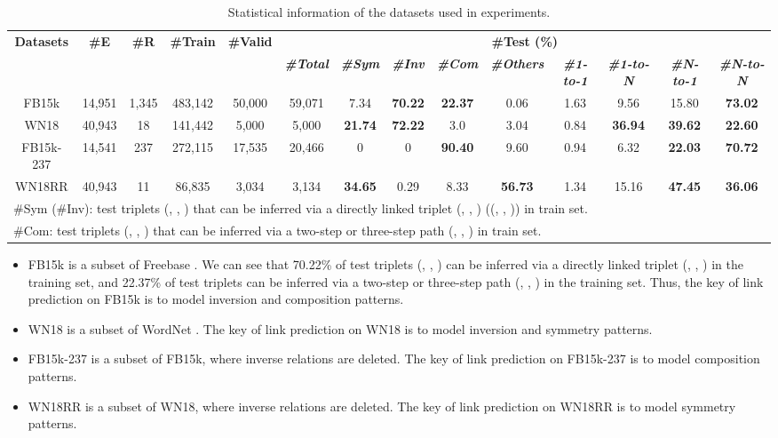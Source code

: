 \documentclass[conference]{IEEEtran}
\begin{document}
\begin{table*}[t]
	\caption{
		Statistical information of the datasets used in experiments.
	}
	\label{Datasets}
	\begin{center}
	\begin{tabular}{|c|c|c|c|c|c||c|c|c|c||c|c|c|c|}
		\hline
		\multirow{2}{*}{\textbf{Datasets}}
		& \multirow{2}{*}{\textbf{\#E}}
		& \multirow{2}{*}{\textbf{\#R}}
		& \multirow{2}{*}{\textbf{\#Train}}
		& \multirow{2}{*}{\textbf{\#Valid}}
		& \multicolumn{9}{c|}{\textbf{\#Test (\%)}}  \\
		\cline{6-14}
		&&&&
		& \textbf{\textit{\#Total}}
		& \textbf{\textit{\#Sym}}	& \textbf{\textit{\#Inv}}	& \textbf{\textit{\#Com}}
		& \textbf{\textit{\#Others}}
		& \textbf{\textit{\#1-to-1}}  & \textbf{\textit{\#1-to-N}}  & \textbf{\textit{\#N-to-1}}
		& \textbf{\textit{\#N-to-N}} \\
		\hline
		FB15k
		& 14,951 & 1,345 & 483,142 & 50,000 & 59,071
		& 7.34	& \textbf{70.22}	& \textbf{22.37}	& 0.06
		& 1.63	& 9.56				& 15.80				& \textbf{73.02} \\
		\hline
		WN18
		& 40,943 & 18	 & 141,442 & 5,000  & 5,000
		& \textbf{21.74}	& \textbf{72.22}	& 3.0				& 3.04
		& 0.84				& \textbf{36.94}	& \textbf{39.62}	& \textbf{22.60}  \\
		\hline
		FB15k-237
		& 14,541	& 237	& 272,115	& 17,535	& 20,466
		& 0		& 0		& \textbf{90.40}	& 9.60
		& 0.94	& 6.32	& \textbf{22.03}	& \textbf{70.72}  \\
		\hline
		WN18RR
		& 40,943 & 11    & 86,835  & 3,034	& 3,134
		& \textbf{34.65}	& 0.29	& 8.33				& \textbf{56.73}
		& 1.34				& 15.16	& \textbf{47.45}	& \textbf{36.06} \\
		\hline
		\multicolumn{14}{l}{
			\#Sym (\#Inv): test triplets (, , ) that can be inferred via a directly linked triplet (, , ) ((, , )) in train set.
		} \\
		\multicolumn{14}{l}{
			\#Com: test triplets (, , ) that can be inferred via a two-step or three-step path (, , ) in train set.
		} \\
	\end{tabular}
	\end{center}
\end{table*}
\begin{itemize}
	\item FB15k is a subset of Freebase \cite{Freebase}. We can see that 70.22\% of test triplets (, , ) can be inferred via a directly linked triplet (, , ) in the training set, and 22.37\% of test triplets can be inferred via a two-step or three-step path (, , ) in the training set. Thus, the key of link prediction on FB15k is to model inversion and composition patterns.
	\item WN18 is a subset of WordNet \cite{WordNet}. The key of link prediction on WN18 is to model inversion and symmetry patterns.
	\item FB15k-237 is a subset of FB15k, where inverse relations are deleted. The key of link prediction on FB15k-237 is to model composition patterns.
	\item WN18RR is a subset of WN18, where inverse relations are deleted. The key of link prediction on WN18RR is to model symmetry patterns.
\end{itemize}
\end{document}
